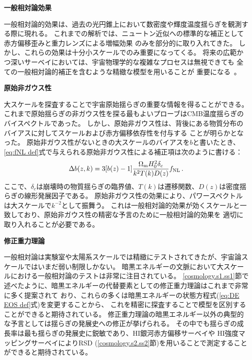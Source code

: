 \begin{description}
\item {\bf 一般相対論効果　}

一般相対論的効果は、過去の光円錐上において数密度や輝度温度揺らぎを観測する際に現れる。
これまでの解析では、ニュートン近似への標準的な補正として赤方偏移歪みと重力レンズによる増幅効果
のみを部分的に取り入れてきた。
しかし、これらの効果は十分小スケールでのみ重要になってくる。
将来の広範かつ深いサーベイにおいては、宇宙物理学的な複雑なプロセスは無視できても
全ての一般相対論的補正を含むような精緻な模型を用いることが
重要になる~\citep{Yoo:2010ni,Bonvin:2011bg,Challinor:2011bk,Bruni:2011ta}。

\item {\bf 原始非ガウス性　}

大スケールを探査することで宇宙原始揺らぎの重要な情報を得ることができる。
これまで原始揺らぎの非ガウス性を探る最もよいプローブはCMB温度揺らぎのバイスペクトルであった。
しかし、原始非ガウス性は、背後にある物質分布のバイアスに対してスケールおよび赤方偏移依存性を付与する
ことが明らかとなった\citep{Dalal:2007cu,Matarrese:2008nc,Schmidt:2010gw,Desjacques:2008vf}。
原始非ガウス性がないときの大スケールのバイアスを$b$と書いたとき、
\eqref{eq:fNL def}式で与えられる原始非ガウス性による補正項は次のように書ける：
\begin{align}
	\Delta b(z,k)=3[b(z)-1]\frac{\Omega_{\rm m}H_0^2\delta_c}{k^2T(k)D(z)}f_{\rm NL}
	\,.\label{eq:scale dependent bias}
\end{align}
ここで、$\delta_c$は崩壊時の物質揺らぎの臨界値、$T(k)$は遷移関数、$D(z)$は密度揺らぎの線形発展因子である。
原始非ガウス性の効果により、パワースペクトルは大スケールで$k^{-2}$として振舞う。
これは一般相対論的効果が効くスケールと一致しており、原始非ガウス性の精密な予言のために一般相対論的効果を
適切に取り入れることが必要である。


\item {\bf 修正重力理論　}

一般相対論は実験室や太陽系スケールでは精緻にテストされてきたが、宇宙論スケールではいまだ弱い制限しかない。
暗黒エネルギーの文脈において大スケールにおける一般相対論のテストは非常に注目されている。
\ref{cosmology.s1.ss1}節で述べたように、暗黒エネルギーの代替要素としての修正重力理論はこれまで非常に多く提案されて
おり、これらの多くは暗黒エネルギーの状態方程式(\eqref{eq:DE EOS def}式)を変更することから、
これを精密に探査することで模型を区別することができると期待されている。
修正重力理論の暗黒エネルギー以外の典型的な予言としては揺らぎの発展史への修正が挙げられる。
その中でも揺らぎの成長率は最も揺らぎの発展史に鋭敏であり、HI銀河赤方偏移サーベイや
HI強度マッピングサーベイによりRSD (\ref{cosmology.s2.ss2}節)を用いることで測定することができると期待されている。

\end{description}


